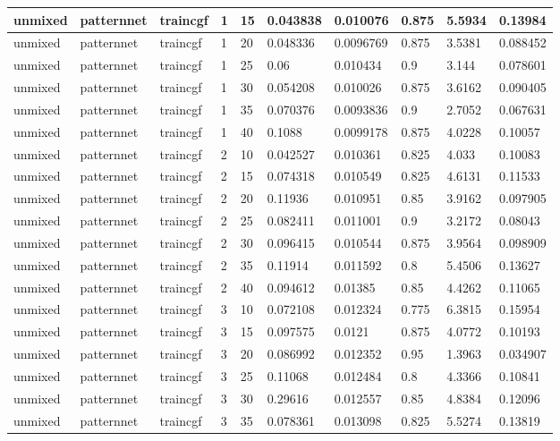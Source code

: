 \begin{longtable}{lllllllll}
unmixed & patternnet & traincgf & 1 & 15 & 0.043838 & 0.010076 & 0.875 & 5.5934 & 0.13984 \\ \hline 
unmixed & patternnet & traincgf & 1 & 20 & 0.048336 & 0.0096769 & 0.875 & 3.5381 & 0.088452 \\ \hline 
unmixed & patternnet & traincgf & 1 & 25 & 0.06 & 0.010434 & 0.9 & 3.144 & 0.078601 \\ \hline 
unmixed & patternnet & traincgf & 1 & 30 & 0.054208 & 0.010026 & 0.875 & 3.6162 & 0.090405 \\ \hline 
unmixed & patternnet & traincgf & 1 & 35 & 0.070376 & 0.0093836 & 0.9 & 2.7052 & 0.067631 \\ \hline 
unmixed & patternnet & traincgf & 1 & 40 & 0.1088 & 0.0099178 & 0.875 & 4.0228 & 0.10057 \\ \hline 
unmixed & patternnet & traincgf & 2 & 10 & 0.042527 & 0.010361 & 0.825 & 4.033 & 0.10083 \\ \hline 
unmixed & patternnet & traincgf & 2 & 15 & 0.074318 & 0.010549 & 0.825 & 4.6131 & 0.11533 \\ \hline 
unmixed & patternnet & traincgf & 2 & 20 & 0.11936 & 0.010951 & 0.85 & 3.9162 & 0.097905 \\ \hline 
unmixed & patternnet & traincgf & 2 & 25 & 0.082411 & 0.011001 & 0.9 & 3.2172 & 0.08043 \\ \hline 
unmixed & patternnet & traincgf & 2 & 30 & 0.096415 & 0.010544 & 0.875 & 3.9564 & 0.098909 \\ \hline 
unmixed & patternnet & traincgf & 2 & 35 & 0.11914 & 0.011592 & 0.8 & 5.4506 & 0.13627 \\ \hline 
unmixed & patternnet & traincgf & 2 & 40 & 0.094612 & 0.01385 & 0.85 & 4.4262 & 0.11065 \\ \hline 
unmixed & patternnet & traincgf & 3 & 10 & 0.072108 & 0.012324 & 0.775 & 6.3815 & 0.15954 \\ \hline 
unmixed & patternnet & traincgf & 3 & 15 & 0.097575 & 0.0121 & 0.875 & 4.0772 & 0.10193 \\ \hline 
unmixed & patternnet & traincgf & 3 & 20 & 0.086992 & 0.012352 & 0.95 & 1.3963 & 0.034907 \\ \hline 
unmixed & patternnet & traincgf & 3 & 25 & 0.11068 & 0.012484 & 0.8 & 4.3366 & 0.10841 \\ \hline 
unmixed & patternnet & traincgf & 3 & 30 & 0.29616 & 0.012557 & 0.85 & 4.8384 & 0.12096 \\ \hline 
unmixed & patternnet & traincgf & 3 & 35 & 0.078361 & 0.013098 & 0.825 & 5.5274 & 0.13819 \\ \hline 

\end{longtable}
